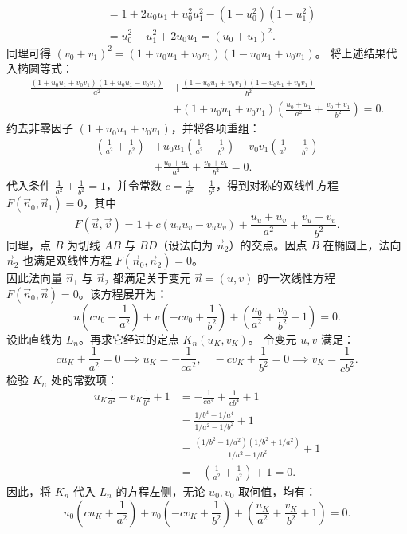 \begin{solution}
\begin{align*}
&= 1 + 2u_0 u_1 + u_0^2 u_1^2 - (1-u_0^2)(1-u_1^2) \\
&= u_0^2 + u_1^2 + 2u_0 u_1 = (u_0+u_1)^2.
\end{align*}
同理可得 $(v_0+v_1)^2 = (1+u_0 u_1+v_0 v_1)(1-u_0 u_1+v_0 v_1)$。
将上述结果代入椭圆等式：
\[
\begin{aligned}
\frac{(1+u_0 u_1+v_0 v_1)(1+u_0 u_1-v_0 v_1)}{a^2}
&+ \frac{(1+u_0 u_1+v_0 v_1)(1-u_0 u_1+v_0 v_1)}{b^2} \\
&+ (1+u_0 u_1+v_0 v_1)
\left( \frac{u_0+u_1}{a^2} + \frac{v_0+v_1}{b^2} \right) = 0.
\end{aligned}
\]
约去非零因子 $(1+u_0 u_1+v_0 v_1)$，并将各项重组：
\[
\begin{aligned}
\left(\frac{1}{a^2} + \frac{1}{b^2}\right)
&+ u_0 u_1\left(\frac{1}{a^2} - \frac{1}{b^2}\right)
- v_0 v_1\left(\frac{1}{a^2} - \frac{1}{b^2}\right) \\
&+ \frac{u_0+u_1}{a^2} + \frac{v_0+v_1}{b^2} = 0.
\end{aligned}
\]
代入条件 $\frac{1}{a^2} + \frac{1}{b^2} = 1$，并令常数 $c = \frac{1}{a^2} - \frac{1}{b^2}$，得到对称的双线性方程 $F(\vec{n}_0, \vec{n}_1) = 0$，其中
\[ F(\vec{u}, \vec{v}) = 1 + c(u_u u_v - v_u v_v) + \frac{u_u+u_v}{a^2} + \frac{v_u+v_v}{b^2}. \]
同理，点 $B$ 为切线 $AB$ 与 $BD$（设法向为 $\vec{n}_2$）的交点。因点 $B$ 在椭圆上，法向 $\vec{n}_2$ 也满足双线性方程 $F(\vec{n}_0, \vec{n}_2) = 0$。\\
因此法向量 $\vec{n}_1$ 与 $\vec{n}_2$ 都满足关于变元 $\vec{n} = (u,v)$ 的一次线性方程 $F(\vec{n}_0, \vec{n}) = 0$。该方程展开为：
\[ u \left( c u_0 + \frac{1}{a^2} \right) + v \left( -c v_0 + \frac{1}{b^2} \right) + \left( \frac{u_0}{a^2} + \frac{v_0}{b^2} + 1 \right) = 0. \]
设此直线为 $L_n$。再求它经过的定点 $K_n(u_K, v_K)$。
令变元 $u, v$ 满足：
\[ c u_K + \frac{1}{a^2} = 0 \implies u_K = -\frac{1}{c a^2}, \quad -c v_K + \frac{1}{b^2} = 0 \implies v_K = \frac{1}{c b^2}. \]
检验 $K_n$ 处的常数项：
\[
\begin{aligned}
u_K \frac{1}{a^2} + v_K \frac{1}{b^2} + 1
&= -\frac{1}{c a^4} + \frac{1}{c b^4} + 1 \\
&= \frac{1/b^4 - 1/a^4}{1/a^2 - 1/b^2} + 1 \\
&= \frac{(1/b^2 - 1/a^2)(1/b^2 + 1/a^2)}{1/a^2 - 1/b^2} + 1 \\
&= -\left(\frac{1}{a^2} + \frac{1}{b^2}\right) + 1 = 0.
\end{aligned}
\]
因此，将 $K_n$ 代入 $L_n$ 的方程左侧，无论 $u_0, v_0$ 取何值，均有：
\[ u_0 \left( c u_K + \frac{1}{a^2} \right) + v_0 \left( -c v_K + \frac{1}{b^2} \right) + \left( \frac{u_K}{a^2} + \frac{v_K}{b^2} + 1 \right) = 0. \]

\end{solution}
